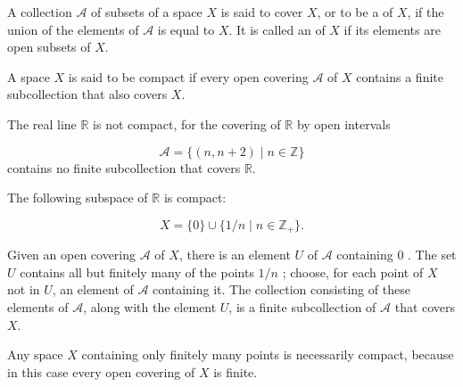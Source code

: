 \begin{definition}
 A collection \(\mathcal{A}\) of subsets of a space \(X\) is said to cover \(X\), or to be a  of \(X\), if the union of the elements of \(\mathcal{A}\) is equal to \(X\). It is called an  of \(X\) if its elements are open subsets of \(X\).
\end{definition}

\begin{definition}
 A space \(X\) is said to be compact if every open covering \(\mathcal{A}\) of \(X\) contains a finite subcollection that also covers \(X\).
\end{definition}

\begin{centeredblock}
\begin{example}
\label{ex:\thesection.\theexample}
 The real line \(\mathbb{R}\) is not compact, for the covering of \(\mathbb{R}\) by open intervals

 \[
 \mathcal{A} = \{ ( {n,n + 2}) \mid n \in \mathbb{Z}\}
 \]
 contains no finite subcollection that covers \(\mathbb{R}\).
\end{example}
\end{centeredblock}

\begin{centeredblock}
\begin{example}
\label{ex:\thesection.\theexample}
 The following subspace of \(\mathbb{R}\) is compact:

 \[
 X = \{ 0\} \cup \{ 1/n \mid n \in {\mathbb{Z}}_{ + }\}.
 \]

Given an open covering \(\mathcal{A}\) of \(X\), there is an element \(U\) of \(\mathcal{A}\) containing 0 . The set \(U\) contains all but finitely many of the points \(1/n\) ; choose, for each point of \(X\) not in \(U\), an element of \(\mathcal{A}\) containing it. The collection consisting of these elements of \(\mathcal{A}\), along with the element \(U\), is a finite subcollection of \(\mathcal{A}\) that covers \(X\).
\end{example}
\end{centeredblock}

\begin{centeredblock}
\begin{example}
\label{ex:\thesection.\theexample}
 Any space \(X\) containing only finitely many points is necessarily compact, because in this case every open covering of \(X\) is finite.
\end{example}
\end{centeredblock}

